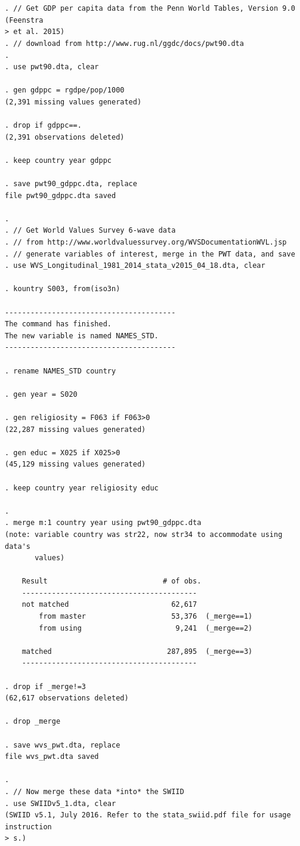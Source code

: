 \documentclass[11pt,]{article}
\theoremstyle{definition}
\theoremstyle{definition}
\theoremstyle{remark}
\begin{document}
\begin{verbatim}


. // Get GDP per capita data from the Penn World Tables, Version 9.0 (Feenstra 
> et al. 2015)
. // download from http://www.rug.nl/ggdc/docs/pwt90.dta
. 
. use pwt90.dta, clear

. gen gdppc = rgdpe/pop/1000
(2,391 missing values generated)

. drop if gdppc==.
(2,391 observations deleted)

. keep country year gdppc

. save pwt90_gdppc.dta, replace
file pwt90_gdppc.dta saved

. 
. // Get World Values Survey 6-wave data 
. // from http://www.worldvaluessurvey.org/WVSDocumentationWVL.jsp
. // generate variables of interest, merge in the PWT data, and save
. use WVS_Longitudinal_1981_2014_stata_v2015_04_18.dta, clear

. kountry S003, from(iso3n)

----------------------------------------
The command has finished.
The new variable is named NAMES_STD.
----------------------------------------

. rename NAMES_STD country

. gen year = S020

. gen religiosity = F063 if F063>0
(22,287 missing values generated)

. gen educ = X025 if X025>0
(45,129 missing values generated)

. keep country year religiosity educ

. 
. merge m:1 country year using pwt90_gdppc.dta
(note: variable country was str22, now str34 to accommodate using data's
       values)

    Result                           # of obs.
    -----------------------------------------
    not matched                        62,617
        from master                    53,376  (_merge==1)
        from using                      9,241  (_merge==2)

    matched                           287,895  (_merge==3)
    -----------------------------------------

. drop if _merge!=3
(62,617 observations deleted)

. drop _merge

. save wvs_pwt.dta, replace
file wvs_pwt.dta saved

. 
. // Now merge these data *into* the SWIID
. use SWIIDv5_1.dta, clear
(SWIID v5.1, July 2016. Refer to the stata_swiid.pdf file for usage instruction
> s.)


\end{verbatim}
\end{document}
